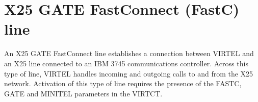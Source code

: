 \documentclass[letterpaper,10pt,english]{sphinxmanual}
\begin{document}
\newpage

\ignorespaces 

\section{X25 GATE Fast\sphinxhyphen{}Connect (FastC) line}
\label{\detokenize{connectivity_guide:x25-gate-fast-connect-fastc-line}}\label{\detokenize{connectivity_guide:index-68}}
\sphinxAtStartPar
An X25 GATE Fast\sphinxhyphen{}Connect line establishes a connection between VIRTEL and an X25 line connected to an IBM 3745 communications controller. Across this type of line, VIRTEL handles incoming and outgoing calls to and from the X25 network. Activation of this type of line requires the presence of the FASTC, GATE and MINITEL parameters in the VIRTCT.

\sphinxAtStartPar
{}

\ignorespaces 
\end{document}
